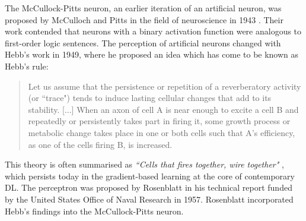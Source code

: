 The McCullock-Pitts neuron, an earlier iteration of an artificial neuron, was
proposed by McCulloch and Pitts in the field of neuroscience in 1943
\cite{McCulloch1943}. Their work contended that neurons with a binary activation
function were analogous to first-order logic sentences. The perception of
artificial neurons changed with Hebb's work in 1949, where he proposed an idea
which has come to be known as Hebb's rule:

\begin{quote}
    Let us assume that the persistence or repetition of a reverberatory activity
    (or ``trace") tends to induce lasting cellular changes that add to its
    stability. [...] When an axon of cell A is near enough to excite a cell B
    and repeatedly or persistently takes part in firing it, some growth process
    or metabolic change takes place in one or both cells such that A’s
    efficiency, as one of the cells firing B, is increased. \cite{10.1007/978-3-642-70911-1_15}
\end{quote}

This theory is often summarised as \textit{``Cells that fires together, wire
together"} \cite{doi:10.1126/science.7912852}, which persists today in the
gradient-based learning at the core of contemporary \gls{DL}. The perceptron was
proposed by Rosenblatt \cite{Rosenblatt_1957_6098} in his technical report
funded by the United States Office of Naval Research
\cite{doi:10.1177/030631296026003005} in 1957. Rosenblatt incorporated Hebb's
findings into the McCullock-Pitts neuron.


